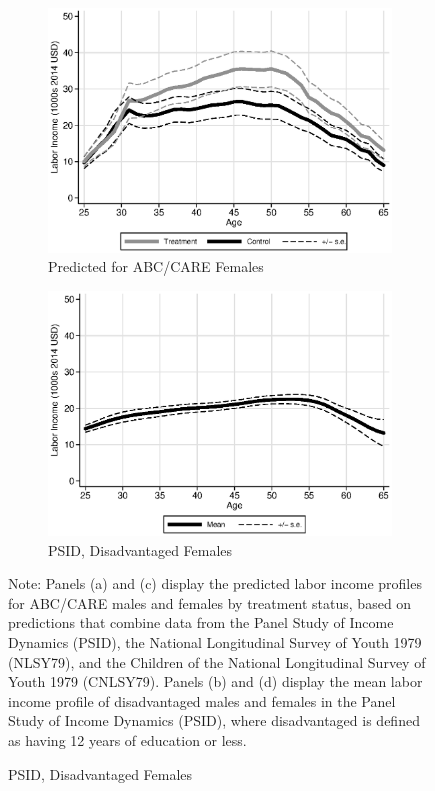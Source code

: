 \begin{figure}
\begin{subfigure}[h]{0.4\textwidth}
		\caption{Predicted for ABC/CARE Females} \label{fig:abcare0}
		\includegraphics[width=\textwidth]{output/labor_25-60_female_1.eps}
\end{subfigure}%
\begin{subfigure}[h]{0.4\textwidth}
	\centering
	\caption{PSID, Disadvantaged Females} \label{fig:psid0}
		\includegraphics[width=\textwidth]{output/psid_incomeprofiles_s0.eps}
\end{subfigure}
\footnotesize \justify
Note: Panels (a) and (c) display the predicted labor income profiles for ABC/CARE males and females by treatment status, based on predictions that combine data from the Panel Study of Income Dynamics (PSID), the National Longitudinal Survey of Youth 1979 (NLSY79), and the Children of the National Longitudinal Survey of Youth 1979 (CNLSY79). Panels (b) and (d) display the mean labor income profile of disadvantaged males and females in the Panel Study of Income Dynamics (PSID), where disadvantaged is defined as having 12 years of education or less.\\
\end{figure}

